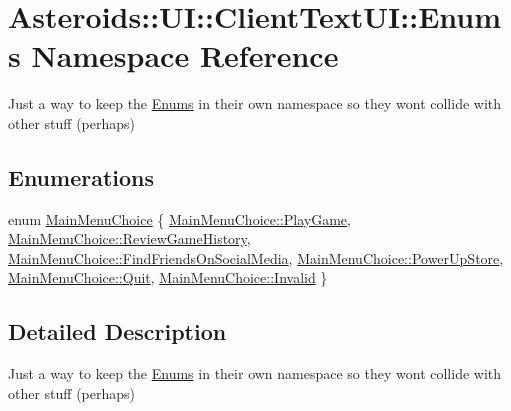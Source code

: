\hypertarget{namespaceAsteroids_1_1UI_1_1ClientTextUI_1_1Enums}{}\section{Asteroids\+:\+:UI\+:\+:Client\+Text\+UI\+:\+:Enums Namespace Reference}
\label{namespaceAsteroids_1_1UI_1_1ClientTextUI_1_1Enums}


Just a way to keep the \hyperlink{namespaceAsteroids_1_1UI_1_1ClientTextUI_1_1Enums}{Enums} in their own namespace so they won\textquotesingle{}t collide with other stuff (perhaps)  


\subsection*{Enumerations}
\begin{DoxyCompactItemize}
\item 
enum \hyperlink{namespaceAsteroids_1_1UI_1_1ClientTextUI_1_1Enums_a009625aa8c73d3ab757537ad32c367b6}{Main\+Menu\+Choice} \{ \newline
\hyperlink{namespaceAsteroids_1_1UI_1_1ClientTextUI_1_1Enums_a009625aa8c73d3ab757537ad32c367b6a2b72748a2883e2d950831bb0c0349259}{Main\+Menu\+Choice\+::\+Play\+Game}, 
\hyperlink{namespaceAsteroids_1_1UI_1_1ClientTextUI_1_1Enums_a009625aa8c73d3ab757537ad32c367b6aee43efdbe6979e551e0ba122a914f48e}{Main\+Menu\+Choice\+::\+Review\+Game\+History}, 
\hyperlink{namespaceAsteroids_1_1UI_1_1ClientTextUI_1_1Enums_a009625aa8c73d3ab757537ad32c367b6a3f8fe0d7e41e0bc664144566d6c3c83a}{Main\+Menu\+Choice\+::\+Find\+Friends\+On\+Social\+Media}, 
\hyperlink{namespaceAsteroids_1_1UI_1_1ClientTextUI_1_1Enums_a009625aa8c73d3ab757537ad32c367b6aa5af59291ef807ba180d70c49a93dede}{Main\+Menu\+Choice\+::\+Power\+Up\+Store}, 
\newline
\hyperlink{namespaceAsteroids_1_1UI_1_1ClientTextUI_1_1Enums_a009625aa8c73d3ab757537ad32c367b6a0d82790b0612935992bd564a17ce37d6}{Main\+Menu\+Choice\+::\+Quit}, 
\hyperlink{namespaceAsteroids_1_1UI_1_1ClientTextUI_1_1Enums_a009625aa8c73d3ab757537ad32c367b6a4bbb8f967da6d1a610596d7257179c2b}{Main\+Menu\+Choice\+::\+Invalid}
 \}
\end{DoxyCompactItemize}


\subsection{Detailed Description}
Just a way to keep the \hyperlink{namespaceAsteroids_1_1UI_1_1ClientTextUI_1_1Enums}{Enums} in their own namespace so they won\textquotesingle{}t collide with other stuff (perhaps) 

